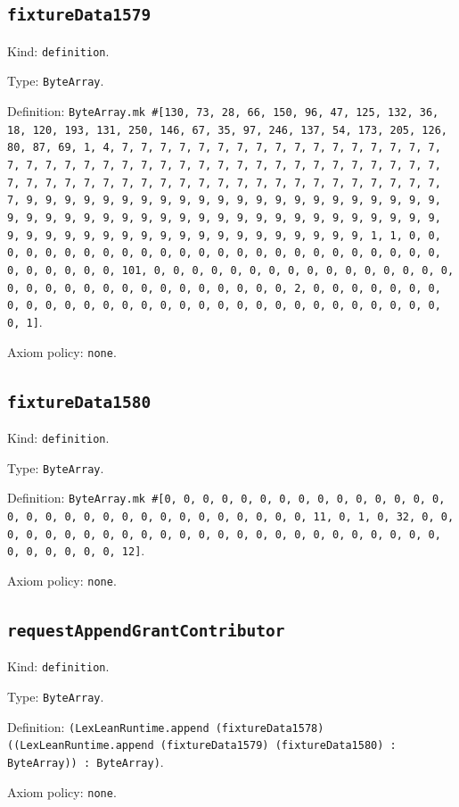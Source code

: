 \documentclass[11pt]{article}
\begin{document}
\subsection*{\texttt{fixtureData1579}}
\noindent Kind: \texttt{definition}.\par
\noindent Type: \texttt{ByteArray}.\par
\noindent Definition: \texttt{ByteArray.mk \#[130, 73, 28, 66, 150, 96, 47, 125, 132, 36, 18, 120, 193, 131, 250, 146, 67, 35, 97, 246, 137, 54, 173, 205, 126, 80, 87, 69, 1, 4, 7, 7, 7, 7, 7, 7, 7, 7, 7, 7, 7, 7, 7, 7, 7, 7, 7, 7, 7, 7, 7, 7, 7, 7, 7, 7, 7, 7, 7, 7, 7, 7, 7, 7, 7, 7, 7, 7, 7, 7, 7, 7, 7, 7, 7, 7, 7, 7, 7, 7, 7, 7, 7, 7, 7, 7, 7, 7, 7, 7, 7, 7, 7, 7, 9, 9, 9, 9, 9, 9, 9, 9, 9, 9, 9, 9, 9, 9, 9, 9, 9, 9, 9, 9, 9, 9, 9, 9, 9, 9, 9, 9, 9, 9, 9, 9, 9, 9, 9, 9, 9, 9, 9, 9, 9, 9, 9, 9, 9, 9, 9, 9, 9, 9, 9, 9, 9, 9, 9, 9, 9, 9, 9, 9, 9, 9, 9, 9, 1, 1, 0, 0, 0, 0, 0, 0, 0, 0, 0, 0, 0, 0, 0, 0, 0, 0, 0, 0, 0, 0, 0, 0, 0, 0, 0, 0, 0, 0, 0, 0, 0, 101, 0, 0, 0, 0, 0, 0, 0, 0, 0, 0, 0, 0, 0, 0, 0, 0, 0, 0, 0, 0, 0, 0, 0, 0, 0, 0, 0, 0, 0, 0, 0, 2, 0, 0, 0, 0, 0, 0, 0, 0, 0, 0, 0, 0, 0, 0, 0, 0, 0, 0, 0, 0, 0, 0, 0, 0, 0, 0, 0, 0, 0, 0, 0, 1]}.\par
\noindent Axiom policy: \texttt{none}.\par
\subsection*{\texttt{fixtureData1580}}
\noindent Kind: \texttt{definition}.\par
\noindent Type: \texttt{ByteArray}.\par
\noindent Definition: \texttt{ByteArray.mk \#[0, 0, 0, 0, 0, 0, 0, 0, 0, 0, 0, 0, 0, 0, 0, 0, 0, 0, 0, 0, 0, 0, 0, 0, 0, 0, 0, 0, 0, 0, 0, 11, 0, 1, 0, 32, 0, 0, 0, 0, 0, 0, 0, 0, 0, 0, 0, 0, 0, 0, 0, 0, 0, 0, 0, 0, 0, 0, 0, 0, 0, 0, 0, 0, 0, 0, 0, 12]}.\par
\noindent Axiom policy: \texttt{none}.\par
\subsection*{\texttt{requestAppendGrantContributor}}
\noindent Kind: \texttt{definition}.\par
\noindent Type: \texttt{ByteArray}.\par
\noindent Definition: \texttt{(LexLeanRuntime.append (fixtureData1578) ((LexLeanRuntime.append (fixtureData1579) (fixtureData1580) : ByteArray)) : ByteArray)}.\par
\noindent Axiom policy: \texttt{none}.\par
\end{document}
